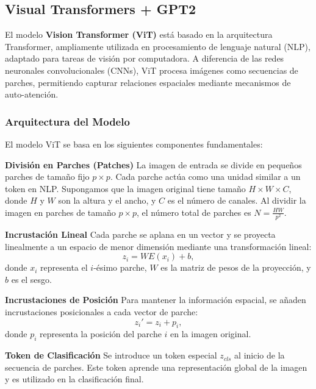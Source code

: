 		
	\subsection{Visual Transformers + GPT2}
	
		El modelo \textbf{Vision Transformer (ViT)} \cite{dosovitskiy2021image} está basado en la arquitectura Transformer, ampliamente utilizada en procesamiento de lenguaje natural (NLP), adaptado para tareas de visión por computadora. A diferencia de las redes neuronales convolucionales (CNNs), ViT procesa imágenes como secuencias de parches, permitiendo capturar relaciones espaciales mediante mecanismos de auto-atención.

		\subsubsection*{Arquitectura del Modelo}
			El modelo ViT se basa en los siguientes componentes fundamentales:

			\textbf{División en Parches (Patches)}
				La imagen de entrada se divide en pequeños parches de tamaño fijo $p \times p$. Cada parche actúa como una unidad similar a un token en NLP. Supongamos que la imagen original tiene tamaño $H \times W \times C$, donde $H$ y $W$ son la altura y el ancho, y $C$ es el número de canales. Al dividir la imagen en parches de tamaño $p \times p$, el número total de parches es $N = \frac{HW}{p^2}$.

			\textbf{Incrustación Lineal}
				Cada parche se aplana en un vector y se proyecta linealmente a un espacio de menor dimensión mediante una transformación lineal:
				\begin{equation}
					z_i = W E(x_i) + b,
				\end{equation}
				donde $x_i$ representa el $i$-ésimo parche, $W$ es la matriz de pesos de la proyección, y $b$ es el sesgo.

			\textbf{Incrustaciones de Posición}
				Para mantener la información espacial, se añaden incrustaciones posicionales a cada vector de parche:
				\begin{equation}
					z_i' = z_i + p_i,
				\end{equation}
				donde $p_i$ representa la posición del parche $i$ en la imagen original.

			\textbf{Token de Clasificación}
				Se introduce un token especial $z_{cls}$ al inicio de la secuencia de parches. Este token aprende una representación global de la imagen y es utilizado en la clasificación final.

